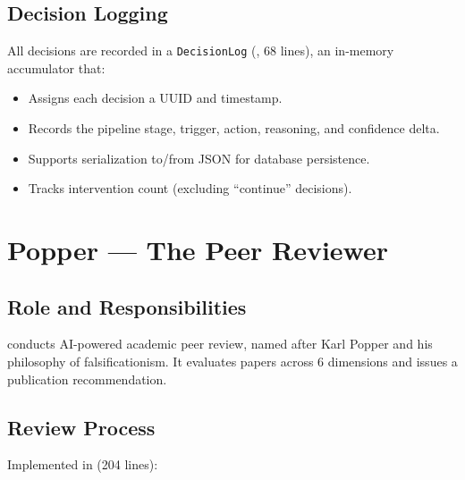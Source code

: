\subsection{Decision Logging}

All \governor decisions are recorded in a \texttt{DecisionLog} (, 68 lines), an in-memory accumulator that:
\begin{itemize}
  \item Assigns each decision a UUID and timestamp.
  \item Records the pipeline stage, trigger, action, reasoning, and confidence delta.
  \item Supports serialization to/from JSON for database persistence.
  \item Tracks intervention count (excluding ``continue'' decisions).
\end{itemize}

\section{Popper --- The Peer Reviewer}
\label{sec:agents:popper}

\subsection{Role and Responsibilities}

\popper conducts AI-powered academic peer review, named after Karl Popper and his philosophy of falsificationism.
It evaluates papers across 6 dimensions and issues a publication recommendation.

\subsection{Review Process}

Implemented in  (204 lines):

